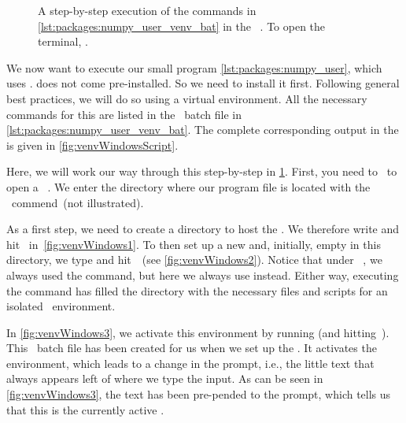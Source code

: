 \begin{figure}
%
\floatRowSep%
%
%
%
\floatSep%
%
%
%
\caption{A step-by-step execution of the commands in \cref{lst:packages:numpy_user_venv_bat} in the \windows\ . %
To open the terminal, \windowsTerminal.}%
\label{fig:venvWindows}%
\end{figure}%

We now want to execute our small program \cref{lst:packages:numpy_user}, which uses \numpy.
\numpy{} does not come pre-installed.
So we need to install it first.
Following general best practices, we will do so using a virtual environment.
All the necessary commands for this are listed in the \windows\ batch file in \cref{lst:packages:numpy_user_venv_bat}.
The complete corresponding output in the  is given in \cref{fig:venvWindowsScript}.

Here, we will work our way through this step-by-step in \cref{fig:venvWindows}.
First, you need to \windowsTerminal\ to open a \windows\ .
We enter the directory where our program file  is located with the ~commend~(not illustrated).

As a first step, we need to create a directory  to host the .
We therefore write  and hit~\keys{\return} in~\cref{fig:venvWindows1}.
To then set up a new and, initially, empty  in this directory, we type  and hit~\keys{\return}~(see \cref{fig:venvWindows2}).
Notice that under \ubuntu\ \linux, we always used the  command, but here we always use  instead.
Either way, executing the command has filled the directory  with the necessary files and scripts for an isolated \python\ environment.

In \cref{fig:venvWindows3}, we activate this environment by running  (and hitting~\keys{\return}).
This \windows\ batch file has been created for us when we set up the .
It activates the environment, which leads to a change in the prompt, i.e., the little text that always appears left of where we type the input.
As can be seen in \cref{fig:venvWindows3}, the text  has been pre-pended to the prompt, which tells us that this is the currently active .

